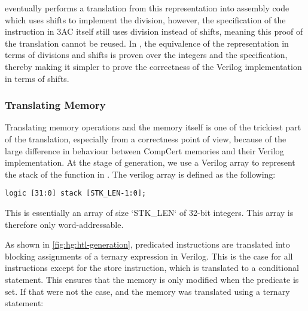 \compcert{} eventually performs a translation from this representation into
assembly code which uses shifts to implement the division, however, the
specification of the instruction in 3AC itself still uses division instead of
shifts, meaning this proof of the translation cannot be reused.  In \vericert{},
the equivalence of the representation in terms of divisions and shifts is proven
over the integers and the specification, thereby making it simpler to prove the
correctness of the Verilog implementation in terms of shifts.

\subsubsection{Translating Memory}


Translating memory operations and the memory itself is one of the trickiest part
of the translation, especially from a correctness point of view, because of the
large difference in behaviour between CompCert memories and their Verilog
implementation.  At the stage of \htl{} generation, we use a Verilog array to
represent the stack of the function in \rtlsubpar{}.  The verilog array is
defined as the following:

\begin{lstlisting}[style=verilog-style]
logic [31:0] stack [STK_LEN-1:0];
\end{lstlisting}

This is essentially an array of size \veriloginline`STK_LEN` of 32-bit integers.
This array is therefore only word-addressable.

As shown in \cref{fig:hg:htl-generation}, predicated instructions are translated
into blocking assignments of a ternary expression in Verilog.  This is the case
for all instructions except for the store instruction, which is translated to a
conditional statement.  This ensures that the memory is only modified when the
predicate is set.  If that were not the case, and the memory was translated
using a ternary statement:

\begin{center}
\end{center}

